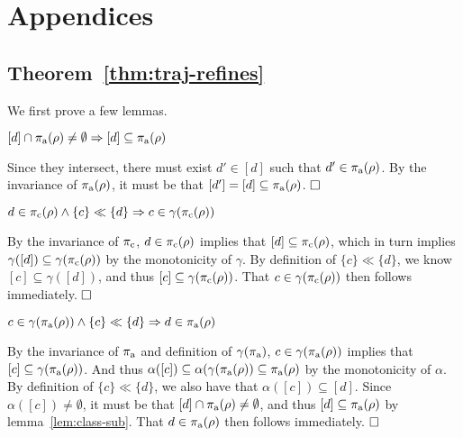 \section{Appendices}

\subsection{Theorem~\ref{thm:traj-refines}}

We first prove a few lemmas.

\begin{lemma} \label{lem:class-sub}
$[d] \cap \operatorname{\pi_{\textrm{a}}}(\rho) \neq \emptyset \Rightarrow [d] \subseteq \operatorname{\pi_{\textrm{a}}}(\rho)$
\end{lemma}

Since they intersect, there must exist $d' \in [d]$ such that $d' \in \operatorname{\pi_{\textrm{a}}}(\rho)$. By the invariance of $\operatorname{\pi_{\textrm{a}}}(\rho)$, it must be that $[d'] = [d] \subseteq \operatorname{\pi_{\textrm{a}}}(\rho)$. $\qedbox$

\begin{lemma} \label{lem:traj-con}
$d \in \operatorname{\pi_{\textrm{c}}}(\rho) \wedge \{ c \} \ll \{ d \} \Rightarrow c \in \gamma(\operatorname{\pi_{\textrm{c}}}(\rho))$
\end{lemma}

By the invariance of $\operatorname{\pi_{\textrm{c}}}$, $d \in \operatorname{\pi_{\textrm{c}}}(\rho)$ implies that $[d] \subseteq \operatorname{\pi_{\textrm{c}}}(\rho)$, which in turn implies $\gamma([d]) \subseteq \gamma(\operatorname{\pi_{\textrm{c}}}(\rho))$ by the monotonicity of $\gamma$. By definition of $\{ c \} \ll \{ d \}$, we know $[c] \subseteq \gamma([d])$, and thus $[c] \subseteq \gamma(\operatorname{\pi_{\textrm{c}}}(\rho))$. That $c \in \gamma(\operatorname{\pi_{\textrm{c}}}(\rho))$ then follows immediately. $\qedbox$

\begin{lemma} \label{lem:traj-ant}
$c \in \gamma(\operatorname{\pi_{\textrm{a}}}(\rho)) \wedge \{ c \} \ll \{ d \} \Rightarrow d \in \operatorname{\pi_{\textrm{a}}}(\rho)$
\end{lemma}

By the invariance of $\operatorname{\pi_{\textrm{a}}}$ and definition of $\gamma(\operatorname{\pi_{\textrm{a}}})$, $c \in \gamma(\operatorname{\pi_{\textrm{a}}}(\rho))$ implies that $[c] \subseteq \gamma(\operatorname{\pi_{\textrm{a}}}(\rho))$. And thus $\alpha([c]) \subseteq \alpha(\gamma(\operatorname{\pi_{\textrm{a}}}(\rho)) \subseteq \operatorname{\pi_{\textrm{a}}}(\rho)$ by the monotonicity of $\alpha$. By definition of $\{ c \} \ll \{ d \}$, we also have that $\alpha([c]) \subseteq [d]$. Since $\alpha([c]) \neq \emptyset$, it must be that $[d] \cap \operatorname{\pi_{\textrm{a}}}(\rho) \neq \emptyset$, and thus $[d] \subseteq \operatorname{\pi_{\textrm{a}}}(\rho)$ by lemma~\ref{lem:class-sub}. That $d \in \operatorname{\pi_{\textrm{a}}}(\rho)$ then follows immediately. $\qedbox$
\\

